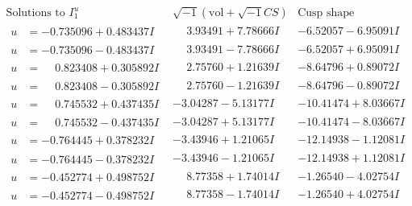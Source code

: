 \documentclass[1p]{elsarticle_modified}
\theoremstyle{definition}
\newcommand{\I}{\sqrt{-1}}
\begin{document}
$$\begin{array}{c|c|c}  
\text{Solutions to }I^u_{1}& \I (\text{vol} + \sqrt{-1}CS) & \text{Cusp shape}\\
 \hline 
\begin{aligned}
u &= -0.735096 + 0.483437 I\end{aligned}
 & \phantom{-}3.93491 + 7.78666 I & -6.52057 - 6.95091 I \\ \hline\begin{aligned}
u &= -0.735096 - 0.483437 I\end{aligned}
 & \phantom{-}3.93491 - 7.78666 I & -6.52057 + 6.95091 I \\ \hline\begin{aligned}
u &= \phantom{-}0.823408 + 0.305892 I\end{aligned}
 & \phantom{-}2.75760 + 1.21639 I & -8.64796 + 0.89072 I \\ \hline\begin{aligned}
u &= \phantom{-}0.823408 - 0.305892 I\end{aligned}
 & \phantom{-}2.75760 - 1.21639 I & -8.64796 - 0.89072 I \\ \hline\begin{aligned}
u &= \phantom{-}0.745532 + 0.437435 I\end{aligned}
 & -3.04287 - 5.13177 I & -10.41474 + 8.03667 I \\ \hline\begin{aligned}
u &= \phantom{-}0.745532 - 0.437435 I\end{aligned}
 & -3.04287 + 5.13177 I & -10.41474 - 8.03667 I \\ \hline\begin{aligned}
u &= -0.764445 + 0.378232 I\end{aligned}
 & -3.43946 + 1.21065 I & -12.14938 - 1.12081 I \\ \hline\begin{aligned}
u &= -0.764445 - 0.378232 I\end{aligned}
 & -3.43946 - 1.21065 I & -12.14938 + 1.12081 I \\ \hline\begin{aligned}
u &= -0.452774 + 0.498752 I\end{aligned}
 & \phantom{-}8.77358 + 1.74014 I & -1.26540 - 4.02754 I \\ \hline\begin{aligned}
u &= -0.452774 - 0.498752 I\end{aligned}
 & \phantom{-}8.77358 - 1.74014 I & -1.26540 + 4.02754 I \\ \hline\begin{aligned}

\end{aligned}
\end{array}$$
\end{document}
